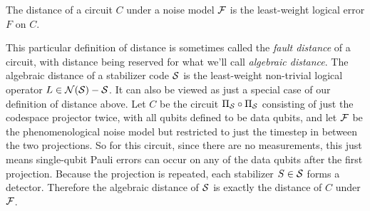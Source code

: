 \begin{definition}\label{defn:distance}
    The distance of a circuit $C$ under a noise model $\mathcal{F}$ is the least-weight logical error $F$ on $C$.
\end{definition}

This particular definition of distance is sometimes called the \textit{fault distance} of a circuit, with distance being reserved for what we'll call \textit{algebraic distance}.
The algebraic distance of a stabilizer code $\mathcal{S}$ is the least-weight non-trivial logical operator $L \in \mathcal{N}(\mathcal{S}) - \mathcal{S}$.
It can also be viewed as just a special case of our definition of distance above.
Let $C$ be the circuit $\Pi_{\mathcal{S}} \circ \Pi_{\mathcal{S}}$ consisting of just the codespace projector twice, with all qubits defined to be data qubits, and let $\mathcal{F}$ be the phenomenological noise model but restricted to just the timestep in between the two projections.
So for this circuit, since there are no measurements, this just means single-qubit Pauli errors can occur on any of the data qubits after the first projection.
Because the projection is repeated, each stabilizer $S \in \mathcal{S}$ forms a detector.
Therefore the algebraic distance of $\mathcal{S}$ is exactly the distance of $C$ under $\mathcal{F}$.
